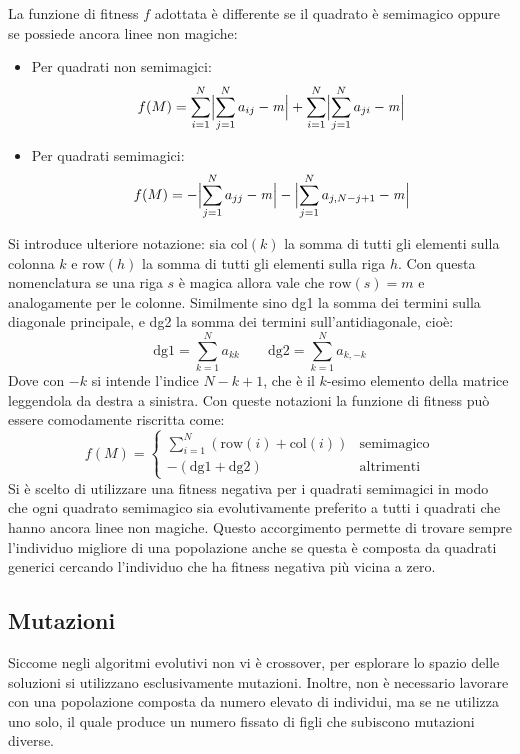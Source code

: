 \documentclass[italian,twoside,twocolumn]{article}
\begin{document}
La funzione di fitness $ f $ adottata è differente se il quadrato è semimagico oppure se possiede ancora linee non magiche:
\begin{itemize}
	\item Per quadrati non semimagici:
	\[	f(M) = \sum_{i=1}^{N}\Bigl\lvert\sum_{j=1}^{N} a_{ij} - \mathit{m} \Bigr\rvert + \sum_{i=1}^{N}\Bigl\lvert\sum_{j=1}^{N} a_{ji} - \mathit{m} \Bigr\rvert 	\]
	\item Per quadrati semimagici:
	\[	f(M) = -\Bigl\lvert\sum_{j=1}^{N} a_{jj} - \mathit{m} \Bigr\rvert - \Bigl\lvert\sum_{j=1}^{N} a_{j,N-j+1} - \mathit{m} \Bigr\rvert 	\]	
\end{itemize}
Si introduce ulteriore notazione: sia $ \text{col}(k) $ la somma di tutti gli elementi sulla colonna $ k $ e $ \text{row}(h) $ la somma di tutti gli elementi sulla riga $ h $. Con questa nomenclatura se una riga $ s $ è magica allora vale che $ \text{row}(s) = \mathit{m}$ e analogamente per le colonne. Similmente sino dg1 la somma dei termini sulla diagonale principale, e dg2 la somma dei termini sull'antidiagonale, cioè:
\[\text{dg1} = \sum_{k = 1}^Na_{kk}  \qquad \text{dg2} = \sum_{k = 1}^Na_{k,-k}  \]
Dove con $ -k $ si intende l'indice $ N-k+1 $, che è il $ k $-esimo elemento della matrice leggendola da destra a sinistra.
Con queste notazioni la funzione di fitness può essere comodamente riscritta come:
\[ f(M) = 
\begin{cases}
\sum_{i = 1}^{N}\left(\text{row}(i) + \text{col}(i) \right) & \text{semimagico} \\
- \left(\text{dg1} + \text{dg2} \right) & \text{altrimenti} 
\end{cases}
\]
Si è scelto di utilizzare una fitness negativa per i quadrati semimagici in modo che ogni quadrato semimagico sia evolutivamente preferito a tutti i quadrati che hanno ancora linee non magiche. Questo accorgimento permette di trovare sempre l'individuo migliore di una popolazione anche se questa è composta da quadrati generici cercando l'individuo che ha fitness negativa più vicina a zero.   

\subsection{Mutazioni}
Siccome negli algoritmi evolutivi non vi è crossover, per esplorare lo spazio delle soluzioni si utilizzano esclusivamente mutazioni. Inoltre, non è necessario lavorare con una popolazione composta da numero elevato di individui, ma se ne utilizza uno solo, il quale produce un numero fissato di figli che subiscono mutazioni diverse.
\end{document}
